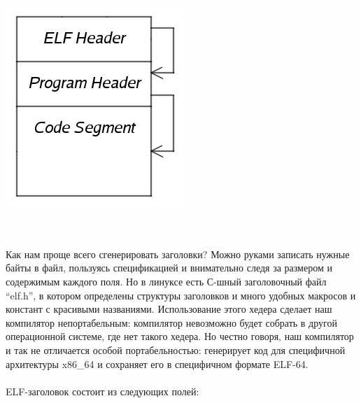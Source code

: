 \documentclass[11pt]{book}
\begin{document}
\begin{minipage}{0.25\textwidth}
\centering
\includegraphics[width=\textwidth]{pic/elf2.png}
\end{minipage}
\\ \\
Как нам проще всего сгенерировать заголовки?
Можно руками записать нужные байты в файл, пользуясь спецификацией и внимательно следя за размером и содержимым каждого поля.
Но в линуксе есть С-шный заголовочный файл ``elf.h'', в котором определены структуры заголовков и много удобных макросов и констант с красивыми названиями.
Использование этого хедера сделает наш компилятор непортабельным:
компилятор невозможно будет собрать в другой операционной системе, где нет такого хедера.
Но честно говоря, наш компилятор и так не отличается особой портабельностью:
генерирует код для специфичной архитектуры x86\_64 и сохраняет его в специфичном формате ELF-64.
\\ \\
ELF-заголовок состоит из следующих полей:
\\ \\
\end{document}

